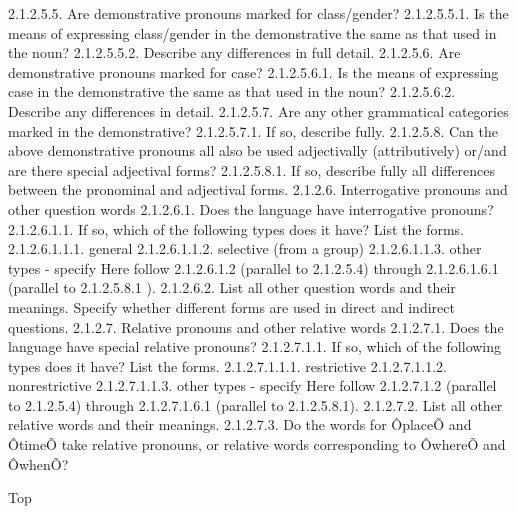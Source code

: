 2.1.2.5.5. Are demonstrative pronouns marked for class/gender?
2.1.2.5.5.1. Is the means of expressing class/gender in the demonstrative the same as that used in the noun?
2.1.2.5.5.2. Describe any differences in full detail.
2.1.2.5.6. Are demonstrative pronouns marked for case?
2.1.2.5.6.1. Is the means of expressing case in the demonstrative the same as that used in the noun?
2.1.2.5.6.2. Describe any differences in detail.
2.1.2.5.7. Are any other grammatical categories marked in the demonstrative?
2.1.2.5.7.1. If so, describe fully.
2.1.2.5.8. Can the above demonstrative pronouns all also be used adjectivally (attributively) or/and are there special adjectival forms?
2.1.2.5.8.1. If so, describe fully all differences between the pronominal and adjectival forms.
2.1.2.6. Interrogative pronouns and other question words
2.1.2.6.1. Does the language have interrogative pronouns?
2.1.2.6.1.1. If so, which of the following types does it have? List the forms.
2.1.2.6.1.1.1. general
2.1.2.6.1.1.2. selective (from a group)
2.1.2.6.1.1.3. other types - specify
Here follow
2.1.2.6.1.2 (parallel to 2.1.2.5.4) through 2.1.2.6.1.6.1 (parallel to 2.1.2.5.8.1 ).
2.1.2.6.2. List all other question words and their meanings. Specify whether different forms are used in direct and indirect questions.
2.1.2.7. Relative pronouns and other relative words
2.1.2.7.1. Does the language have special relative pronouns?
2.1.2.7.1.1. If so, which of the following types does it have? List the forms.
2.1.2.7.1.1.1. restrictive
2.1.2.7.1.1.2. nonrestrictive
2.1.2.7.1.1.3. other types - specify
Here follow
2.1.2.7.1.2 (parallel to 2.1.2.5.4) through 2.1.2.7.1.6.1 (parallel to 2.1.2.5.8.1).
2.1.2.7.2. List all other relative words and their meanings.
2.1.2.7.3. Do the words for ÔplaceÕ and ÔtimeÕ take relative pronouns, or relative words corresponding to ÔwhereÕ and ÔwhenÕ?



Top

